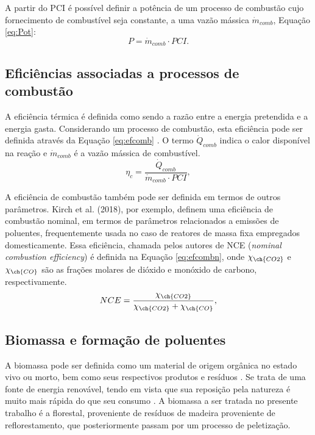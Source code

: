 A partir do PCI é possível definir a potência de um processo de combustão cujo fornecimento de combustível seja constante, a uma vazão mássica $\dot{m}_{comb}$, Equação \eqref{eq:Pot}:
\begin{equation} \label{eq:Pot}
P = \dot{m}_{comb} \cdot PCI.    
\end{equation}


\subsection{Eficiências associadas a processos de combustão}
A eficiência térmica é definida como sendo a razão entre a energia pretendida e a energia gasta. Considerando um processo de combustão, esta eficiência pode ser definida através da Equação \eqref{eq:efcomb} \cite{Turns}. O termo $\dot{Q}_{comb}$ indica o calor disponível na reação e $\dot{m}_{comb}$ é a vazão mássica de combustível.
\begin{equation} \label{eq:efcomb}
\eta_{c} = \frac{\dot{Q}_{comb}}{\dot{m}_{comb}\cdot PCI},
\end{equation}

A eficiência de combustão também pode ser definida em termos de outros parâmetros. Kirch et al. (2018), por exemplo, definem uma eficiência de combustão nominal, em termos de parâmetros relacionados a emissões de poluentes, frequentemente usada no caso de reatores de massa fixa empregados domesticamente. Essa eficiência, chamada pelos autores de NCE (\textit{nominal combustion efficiency}) é definida na Equação \eqref{eq:efcombn}, onde $\chi_{\ch{CO2}}$ e $\chi_{\ch{CO}}$ são as frações molares de dióxido e monóxido de carbono, respectivamente. 
\begin{equation} \label{eq:efcombn}
NCE = \frac{\chi_{\ch{CO2}}}{\chi_{\ch{CO2}} + \chi_{\ch{CO}}},
\end{equation}

\subsection{Biomassa e formação de poluentes}
A biomassa pode ser definida como um material de origem orgânica no estado vivo ou morto, bem como seus respectivos produtos e resíduos \cite{Spliethoff}. Se trata de uma fonte de energia renovável, tendo em vista que sua reposição pela natureza é muito mais rápida do que seu consumo \cite{Brand}. A biomassa a ser tratada no presente trabalho é a florestal, proveniente de resíduos de madeira proveniente de reflorestamento, que posteriormente passam por um processo de peletização.

